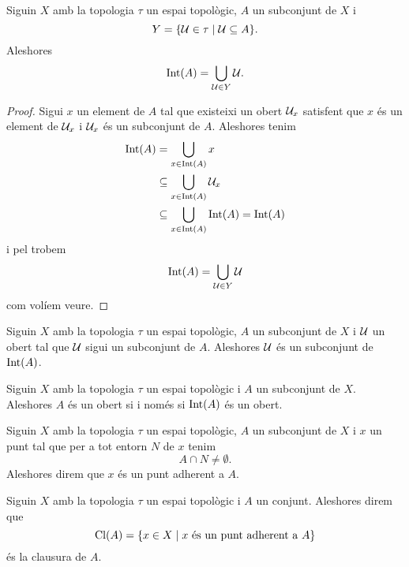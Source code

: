 \documentclass[../Apunts.tex]{subfiles}
\begin{document}
	\begin{proposition}
		\label{prop:l'interior d'un conjunt és l'unió de tots els oberts continguts en el conjunt}
		Siguin \(X\) amb la topologia \(\tau\) un espai topològic, \(A\) un subconjunt de \(X\) i
		\[Y=\{\mathcal{U}\in\tau\mid\mathcal{U}\subseteq A\}.\]
		Aleshores
		\[\operatorname{Int}(A)=\bigcup_{\mathcal{U}\in Y}\mathcal{U}.\]
		\begin{proof}
			Sigui \(x\) un element de \(A\) tal que existeixi un obert \(\mathcal{U}_{x}\) satisfent que \(x\) és un element de \(\mathcal{U}_{x}\) i \(\mathcal{U}_{x}\) és un subconjunt de \(A\). Aleshores tenim
			\begin{align*}
				\operatorname{Int}(A)&=\bigcup_{x\in\operatorname{Int}(A)}x \\
				&\subseteq\bigcup_{x\in\operatorname{Int}(A)}\mathcal{U}_{x} \\
				&\subseteq\bigcup_{x\in\operatorname{Int}(A)}\operatorname{Int}(A)=\operatorname{Int}(A)
			\end{align*}
			i pel  trobem
			\[\operatorname{Int}(A)=\bigcup_{\mathcal{U}\in Y}\mathcal{U}\]
			com volíem veure.
		\end{proof}
	\end{proposition}
	\begin{corollary}
		\label{cor:l'interior d'un conjunt conté tots els seus oberts}
		Siguin \(X\) amb la topologia \(\tau\) un espai topològic, \(A\) un subconjunt de \(X\) i \(\mathcal{U}\) un obert tal que \(\mathcal{U}\) sigui un subconjunt de \(A\). Aleshores \(\mathcal{U}\) és un subconjunt de \(\operatorname{Int}(A)\).
	\end{corollary}
	\begin{corollary}
		\label{cor:un conjunt és obert si i només si el seu interior és obert}
		Siguin \(X\) amb la topologia \(\tau\) un espai topològic i \(A\) un subconjunt de \(X\). Aleshores \(A\) és un obert si i només si \(\operatorname{Int}(A)\) és un obert.
	\end{corollary}
	\begin{definition}
		\label{def:punt adherent}
		Siguin \(X\) amb la topologia \(\tau\) un espai topològic, \(A\) un subconjunt de \(X\) i \(x\) un punt tal que per a tot entorn \(N\) de \(x\) tenim
		\[A\cap N\neq\emptyset.\]
		Aleshores direm que \(x\) és un punt adherent a \(A\).
	\end{definition}
	\begin{definition}[Clausura]
		\label{def:clausura}
		Siguin \(X\) amb la topologia \(\tau\) un espai topològic i \(A\) un conjunt. Aleshores direm que
		\[\operatorname{Cl}(A)=\{x\in X\mid x\text{ és un punt adherent a }A\}\]
		és la clausura de \(A\).
	\end{definition}
\end{document}

